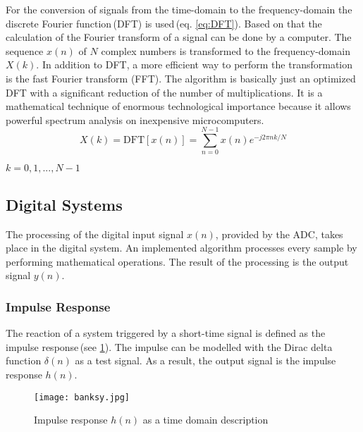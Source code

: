 For the conversion of signals from the time-domain to the frequency-domain the 
discrete Fourier function\,(DFT) is used\,(eq. \ref{eq:DFT}). Based on that the calculation of the Fourier
transform of a signal can be done by a computer. The sequence $x(n)$ of $N$ complex numbers is
transformed to the frequency-domain $X(k)$.
In addition to DFT, a more efficient way to perform the transformation is the fast Fourier transform (FFT).
The algorithm is basically just an optimized DFT with a significant reduction of the number of multiplications.
It is a mathematical technique of enormous  technological importance because it allows powerful spectrum analysis on inexpensive microcomputers.\\


\begin{equation}
X(k) =\mathrm{ DFT}[x(n)] = \sum_{n=0}^{N-1} x(n)e^{-j2\pi nk/N}
\label{eq:DFT}
\end{equation}
\begin{center}
$ k=0,1,...,N-1$
\end{center}



\subsection{Digital Systems}

The processing of the digital input signal $x(n)$, provided by the ADC, takes place in the digital system.
An implemented algorithm processes every sample by performing mathematical operations.
The result of the processing is the output signal $y(n)$.


\subsubsection{Impulse Response}

The reaction of a system triggered by a short-time signal is defined as the impulse response\,(see \ref{fig:ImpulseResponse}).
The impulse can be modelled with the Dirac delta function $\delta(n)$ as a test signal.
As a result, the output signal is the impulse response $h(n)$.


\begin{figure}[H]
	\centering \texttt{[image: banksy.jpg]}
	\caption[ImpulseResponse]{Impulse response $h(n)$ as a time domain description \cite[p.\,18]{Zolzer:2002}}
	\label{fig:ImpulseResponse}
\end{figure}


